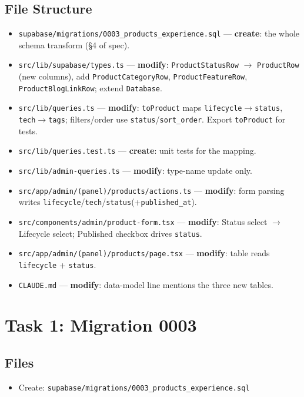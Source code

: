\documentclass[11pt,a4paper]{article}
\begin{document}
\subsection*{File Structure}
\begin{itemize}
  \item \texttt{supabase/migrations/0003\_products\_experience.sql} --- \textbf{create}: the
        whole schema transform (\S4 of spec).
  \item \texttt{src/lib/supabase/types.ts} --- \textbf{modify}: \texttt{ProductStatusRow}
        $\rightarrow$ \texttt{ProductRow} (new columns), add \texttt{ProductCategoryRow},
        \texttt{ProductFeatureRow}, \texttt{ProductBlogLinkRow}; extend \texttt{Database}.
  \item \texttt{src/lib/queries.ts} --- \textbf{modify}: \texttt{toProduct} maps
        \texttt{lifecycle}$\rightarrow$\texttt{status}, \texttt{tech}$\rightarrow$\texttt{tags};
        filters/order use \texttt{status}/\texttt{sort\_order}. Export \texttt{toProduct} for
        tests.
  \item \texttt{src/lib/queries.test.ts} --- \textbf{create}: unit tests for the mapping.
  \item \texttt{src/lib/admin-queries.ts} --- \textbf{modify}: type-name update only.
  \item \texttt{src/app/admin/(panel)/products/actions.ts} --- \textbf{modify}: form parsing
        writes \texttt{lifecycle}/\texttt{tech}/\texttt{status}(+\texttt{published\_at}).
  \item \texttt{src/components/admin/product-form.tsx} --- \textbf{modify}: Status select
        $\rightarrow$ Lifecycle select; Published checkbox drives \texttt{status}.
  \item \texttt{src/app/admin/(panel)/products/page.tsx} --- \textbf{modify}: table reads
        \texttt{lifecycle} + \texttt{status}.
  \item \texttt{CLAUDE.md} --- \textbf{modify}: data-model line mentions the three new tables.
\end{itemize}

\section{Task 1: Migration 0003}

\subsection*{Files}
\begin{itemize}
  \item Create: \texttt{supabase/migrations/0003\_products\_experience.sql}
\end{itemize}
\end{document}
